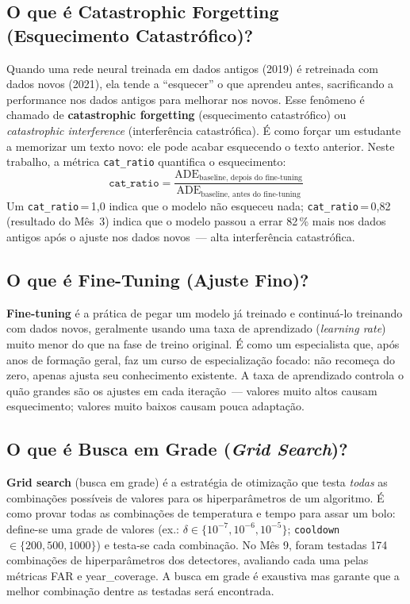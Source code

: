 \documentclass[11pt,a4paper]{article}
\begin{document}
\subsection*{O que \'e Catastrophic Forgetting (Esquecimento Catastr\'ofico)?}

Quando uma rede neural treinada em dados antigos (2019) \'e retreinada com dados novos (2021), ela tende a ``esquecer'' o que aprendeu antes, sacrificando a performance nos dados antigos para melhorar nos novos. Esse fen\^omeno \'e chamado de \textbf{catastrophic forgetting} (esquecimento catastr\'ofico) ou \emph{catastrophic interference} (interfer\^encia catastr\'ofica). \'E como for\c{c}ar um estudante a memorizar um texto novo: ele pode acabar esquecendo o texto anterior. Neste trabalho, a m\'etrica \texttt{cat\_ratio} quantifica o esquecimento:
\[
\texttt{cat\_ratio} = \frac{\mathrm{ADE}_{\text{baseline, depois do fine-tuning}}}{\mathrm{ADE}_{\text{baseline, antes do fine-tuning}}}
\]
Um \texttt{cat\_ratio}\,=\,1{,}0 indica que o modelo n\~ao esqueceu nada; \texttt{cat\_ratio}\,=\,0{,}82 (resultado do M\^es~3) indica que o modelo passou a errar 82\,\% mais nos dados antigos ap\'os o ajuste nos dados novos~--- alta interfer\^encia catastr\'ofica.

\subsection*{O que \'e Fine-Tuning (Ajuste Fino)?}

\textbf{Fine-tuning} \'e a pr\'atica de pegar um modelo j\'a treinado e continu\'a-lo treinando com dados novos, geralmente usando uma taxa de aprendizado (\emph{learning rate}) muito menor do que na fase de treino original. \'E como um especialista que, ap\'os anos de forma\c{c}\~ao geral, faz um curso de especializa\c{c}\~ao focado: n\~ao recome\c{c}a do zero, apenas ajusta seu conhecimento existente. A taxa de aprendizado controla o qu\~ao grandes s\~ao os ajustes em cada itera\c{c}\~ao~--- valores muito altos causam esquecimento; valores muito baixos causam pouca adapta\c{c}\~ao.

\subsection*{O que \'e Busca em Grade (\emph{Grid Search})?}

\textbf{Grid search} (busca em grade) \'e a estrat\'egia de otimiza\c{c}\~ao que testa \emph{todas} as combina\c{c}\~oes poss\'iveis de valores para os hiperpar\^ametros de um algoritmo. \'E como provar todas as combina\c{c}\~oes de temperatura e tempo para assar um bolo: define-se uma grade de valores (ex.: $\delta \in \{10^{-7}, 10^{-6}, 10^{-5}\}$; \texttt{cooldown}$\in \{200, 500, 1000\}$) e testa-se cada combina\c{c}\~ao. No M\^es 9, foram testadas 174 combina\c{c}\~oes de hiperpar\^ametros dos detectores, avaliando cada uma pelas m\'etricas FAR e year\_coverage. A busca em grade \'e exaustiva mas garante que a melhor combina\c{c}\~ao dentre as testadas ser\'a encontrada.
\end{document}
